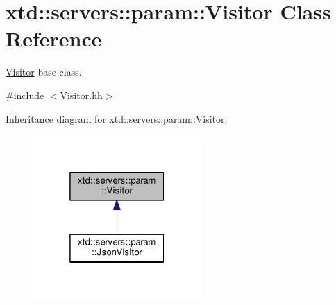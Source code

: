 \hypertarget{classxtd_1_1servers_1_1param_1_1Visitor}{}\section{xtd\+:\+:servers\+:\+:param\+:\+:Visitor Class Reference}
\label{classxtd_1_1servers_1_1param_1_1Visitor}


\hyperlink{classxtd_1_1servers_1_1param_1_1Visitor}{Visitor} base class.  




{\ttfamily \#include $<$Visitor.\+hh$>$}



Inheritance diagram for xtd\+:\+:servers\+:\+:param\+:\+:Visitor\+:
\nopagebreak
\begin{figure}[H]
\begin{center}
\leavevmode
\includegraphics[width=181pt]{classxtd_1_1servers_1_1param_1_1Visitor__inherit__graph}
\end{center}
\end{figure}

